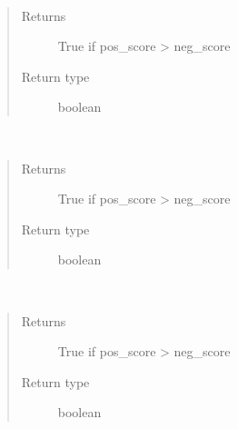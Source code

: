\documentclass[letterpaper,10pt,english]{sphinxmanual}
\begin{document}
\begin{fulllineitems}
\begin{fulllineitems}
\label{\detokenize{classes:loacore.classes.classes.Polarity.is_negative}}~\begin{quote}\begin{description}
\item[{Returns}] \leavevmode
True if pos\_score \textgreater{} neg\_score

\item[{Return type}] \leavevmode
boolean

\end{description}\end{quote}

\end{fulllineitems}


\begin{fulllineitems}
\label{\detokenize{classes:loacore.classes.classes.Polarity.is_objective}}~\begin{quote}\begin{description}
\item[{Returns}] \leavevmode
True if pos\_score \textgreater{} neg\_score

\item[{Return type}] \leavevmode
boolean

\end{description}\end{quote}

\end{fulllineitems}


\begin{fulllineitems}
\label{\detokenize{classes:loacore.classes.classes.Polarity.is_positive}}~\begin{quote}\begin{description}
\item[{Returns}] \leavevmode
True if pos\_score \textgreater{} neg\_score

\item[{Return type}] \leavevmode
boolean

\end{description}\end{quote}

\end{fulllineitems}


\end{fulllineitems}
\end{document}
